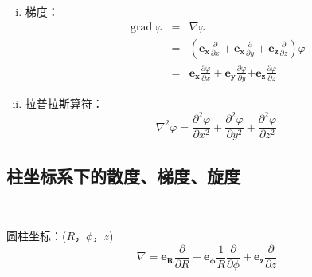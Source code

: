 \documentclass[UTF8]{ctexart}
\newcommand{\tmmathbf}[1]{\ensuremath{\boldsymbol{#1}}}
\newcommand{\tmop}[1]{\ensuremath{\operatorname{#1}}}
\newenvironment{enumerateroman}{\begin{enumerate}[i.] }{\end{enumerate}}
\begin{document}
\begin{enumerateroman}
\begin{eqnarray}
{    f_x}{\partial z} - \frac{\partial f_z}{\partial x} \right) \tmmathbf{e_y}
    + \left( \frac{\partial f_y}{\partial x} - \frac{\partial f_x}{\partial y}
    \right) \tmmathbf{e_z} 
  \end{eqnarray}
  \item 梯度：
  \begin{eqnarray}
    \tmop{grad} \varphi & = & \nabla \varphi \nonumber\\
    & = & \left( \tmmathbf{e_x} \frac{\partial}{\partial x} + \tmmathbf{e_x}
    \frac{\partial}{\partial y} + \tmmathbf{e_z} \frac{\partial}{\partial z}
    \right) \varphi \nonumber\\
    & = & \tmmathbf{e_x} \frac{\partial \varphi}{\partial x} + \tmmathbf{e_y}
    \frac{\partial \varphi}{\partial y} \tmmathbf{+} \tmmathbf{e_z}
    \frac{\partial \varphi}{\partial z} 
  \end{eqnarray}
  \item 拉普拉斯算符：
  \begin{equation}
    \nabla^2 \varphi = \frac{\partial^2 \varphi}{\partial x^2} +
    \frac{\partial^2 \varphi}{\partial y^2} + \frac{\partial^2
    \varphi}{\partial z^2}
  \end{equation}
\end{enumerateroman}

\subsection{柱坐标系下的散度、梯度、旋度}

\

圆柱坐标：($R$，$\phi$，$z$)
\begin{equation}
  \nabla = \tmmathbf{e_R} \frac{\partial}{\partial R} + \tmmathbf{e_{\phi}}
  \frac{1}{R} \frac{\partial}{\partial \phi} + \tmmathbf{e_z}
  \frac{\partial}{\partial z}
\end{equation}
\end{document}
